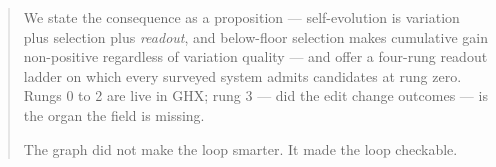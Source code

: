 \begin{abstract}
We state the consequence as a proposition --- self-evolution is variation
plus selection plus \emph{readout}, and below-floor selection makes
cumulative gain non-positive regardless of variation quality --- and offer
a four-rung readout ladder on which every surveyed system admits
candidates at rung zero. Rungs 0 to 2 are live in GHX; rung 3 --- did the
edit change outcomes --- is the organ the field is missing.

The graph did not make the loop smarter. It made the loop checkable.
\end{abstract}
